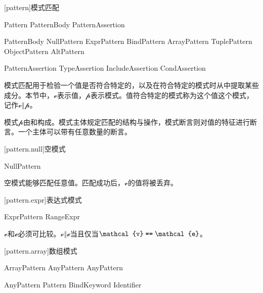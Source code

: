 
[pattern]{模式匹配}

\begin{bnf}{Pattern}
    PatternBody PatternAssertion\bnfs
\end{bnf}

\begin{bnf}{PatternBody}
    NullPattern \br
    ExprPattern \br
    BindPattern \br
    ArrayPattern \br
    TuplePattern \br
    ObjectPattern \br
    AltPattern
\end{bnf}

\begin{bnf}{PatternAssertion}
    TypeAssertion \br
    IncludeAssertion \br
    CondAssertion
\end{bnf}

\pnum
模式匹配用于检验一个值是否符合特定的，以及在符合特定的模式时从中提取某些成分。本节中，$\mathcal{v}$表示值，$\mathcal{p}$表示模式。值符合特定的模式称为这个值这个模式，记作$\mathcal{v}\mathrel{\Vert}\mathcal{p}$。

\pnum
模式$\mathcal{p}$由和构成。模式主体规定匹配的结构与操作，模式断言则对值的特征进行断言。一个主体可以带有任意数量的断言。

[pattern.null]{空模式}

\begin{bnf}{NullPattern}
    \tcode{_}
\end{bnf}

\pnum
空模式能够匹配任意值。匹配成功后，$\mathcal{v}$的值将被丢弃。

[pattern.expr]{表达式模式}

\begin{bnf}{ExprPattern}
    RangeExpr
\end{bnf}

\pnum
$\mathcal{v}$和$\mathcal{e}$必须可比较。$\mathcal{v}\mathrel{\Vert}\mathcal{e}$当且仅当$\mathcal{v}\mathrel{\tcode{==}}\mathcal{e}$。

[pattern.array]{数组模式}

\begin{bnf}{ArrayPattern}
    \terminal{[} AnyPattern \bnflp\terminal{,} AnyPattern\bnfrp\bnfs\ \terminal{]}
\end{bnf}

\begin{bnf}{AnyPattern}
    Pattern\br
     \br
    BindKeyword  Identifier
\end{bnf}

